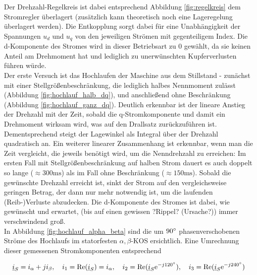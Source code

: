 \noindent Der Drehzahl-Regelkreis ist dabei entsprechend Abbildung \ref{fig:regelkreis} dem Stromregler überlagert (zusätzlich kann theoretisch noch eine Lageregelung überlagert werden). Die Entkopplung sorgt dabei für eine Unabhängigkeit der Spannungen $u_d$ und $u_q$ von den jeweiligen Strömen mit gegenteiligem Index. Die d-Komponente des Stromes wird in dieser Betriebsart zu 0 gewählt, da sie keinen Anteil am Drehmoment hat und lediglich zu unerwünschten Kupferverlusten führen würde.\\
\noindent Der erste Versuch ist das Hochlaufen der Maschine aus dem Stillstand - zunächst mit einer Stellgrößenbeschränkung, die lediglich halbes Nennmoment zulässt (Abbildung \ref{fig:hochlauf_halb_dq}), und anschließend ohne Beschränkung (Abbildung \ref{fig:hochlauf_ganz_dq}). Deutlich erkennbar ist der lineare Anstieg der Drehzahl mit der Zeit, sobald die q-Stromkomponente und damit ein Drehmoment wirksam wird, was auf den Drallsatz zurückzuführen ist. Dementsprechend steigt der Lagewinkel als Integral über der Drehzahl quadratisch an. Ein weiterer linearer Zusammenhang ist erkennbar, wenn man die Zeit vergleicht, die jeweils benötigt wird, um die Nenndrehzahl zu erreichen: Im ersten Fall mit Stellgrößenbeschränkung auf halben Strom dauert es auch doppelt so lange ($\approx 300 \si{\milli\second}$) als im Fall ohne Beschränkung ($\approx 150 \si{\milli\second}$). Sobald die gewünschte Drehzahl erreicht ist, sinkt der Strom auf den vergleichsweise geringen Betrag, der dann nur mehr notwendig ist, um die laufenden (Reib-)Verluste abzudecken. Die d-Komponente des Stromes ist dabei, wie gewünscht und erwartet, (bis auf einen gewissen ?Rippel? (Ursache?)) immer verschwindend groß.\\
\noindent In Abbildung \ref{fig:hochlauf_alpha_beta} sind die um $90\degree$ phasenverschobenen Ströme des Hochlaufs im statorfesten $\alpha,\beta$-KOS ersichtlich. Eine Umrechnung dieser gemessenen Stromkomponenten entsprechend

\begin{equation}
    \underline{i}_{S} = i_{\alpha} + j i_{\beta}, \quad i_1=\operatorname{Re}(\underline{i}_{S})=i_{\alpha}, \quad i_2=\operatorname{Re}(\underline{i}_{S} \mathrm{e}^{-j 120 \degree}), \quad i_3=\operatorname{Re}(\underline{i}_{S} \mathrm{e}^{-j 240 \degree})
    \label{eq:umrechnung}
\end{equation}


